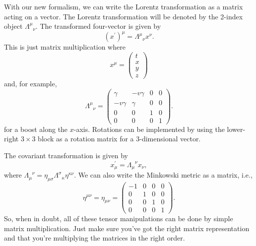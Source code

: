 \documentclass{article}
\begin{document}
With our new formalism, we can write the Lorentz transformation as a matrix acting on a vector. The Lorentz transformation will be denoted by the 2-index object $\Lambda^\mu_{\,\,\,\, \nu}$. The transformed four-vector is given by \begin{equation} (x^\prime)^\mu = \Lambda^\mu_{\,\,\,\, \nu} x^\nu . \end{equation} This is just matrix multiplication where 
\begin{equation}
x^\mu = \left ( \begin{array}{c} t \\ x \\ y \\ z \end{array} \right )
\end{equation}
and, for example, 
\begin{equation} 
\Lambda^\mu_{\,\,\,\, \nu} = \left( \begin{array}{cccc}
\gamma & - v \gamma & 0 & 0 \\
- v \gamma & \gamma & 0 & 0 \\
0 & 0 & 1 & 0 \\
0 & 0 & 0 & 1 
\end{array} \right) .
\end{equation}
for a boost along the $x$-axis. Rotations can be implemented by using the lower-right $3 \times 3$ block as a rotation matrix for a 3-dimensional vector.

The covariant transformation is given by \begin{equation} x^\prime_\mu = \Lambda_\mu^{\,\,\,\, \nu} x_\nu , \end{equation} where $\Lambda_\mu^{\,\,\,\, \nu} = \eta_{\mu \sigma} \Lambda^\sigma_{\,\,\,\, \kappa} \eta^{\kappa \nu}$. We can also write the Minkowski metric as a matrix, i.e., 
\begin{equation} 
\eta^{\mu \nu} = \eta_{\mu \nu} = \left( \begin{array}{cccc}
-1& 0 & 0 & 0 \\
0 & 1 & 0 & 0 \\
0 & 0 & 1 & 0 \\
0 & 0 & 0 & 1 
\end{array} \right) .
\end{equation}
So, when in doubt, all of these tensor manipulations can be done by simple matrix multiplication. Just make sure you've got the right matrix representation and that you're multiplying the matrices in the right order.
\end{document}
